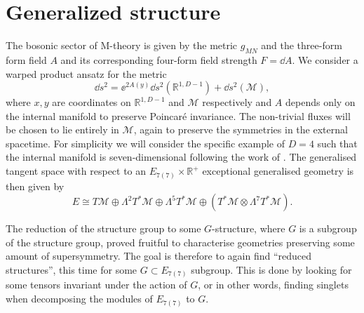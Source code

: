 \section{Generalized structure\label{sec:GeneralisedStructures}}
The bosonic sector of M-theory is given by the metric $g_{MN}$ and the three-form form field $A$ and its corresponding four-form field strength $F=\dd A$. We consider a warped product ansatz for the metric 
\begin{equation}
    \dd s^2 = \ee^{2A(y)}\dd s^2(\mathbb{R}^{1,D-1})+\dd s^2(\mathcal{M}),
\end{equation}
where $x,y$ are coordinates on $\mathbb{R}^{1,D-1}$ and $\mathcal{M}$ respectively and $A$ depends only on the internal manifold to preserve Poincaré invariance. The non-trivial fluxes will be chosen to lie entirely in $\mathcal{M}$, again to preserve the symmetries in the external spacetime. For simplicity we will consider the specific example of $D=4$ such that the internal manifold is seven-dimensional following the work of \cite{Ashmore:2015joa}. The generalised tangent space with respect to an $E_{7(7)}\times\mathbb{R}^+$ exceptional generalised geometry is then given by 
\begin{equation}
    E \cong T\mathcal{M}\oplus\Lambda^2T^*\mathcal{M}\oplus\Lambda^5T^*\mathcal{M}\oplus\left(T^*\mathcal{M}\otimes\Lambda^7 T^*\mathcal{M}\right).
\end{equation}

\begin{comment}
Moreover, given $E$ we can construct the generalized frame bundle $F$ given by frames $\{E_A\}$, where $A=1,2,\ldots 56$. Explicitly, in a patch $U$ there exists a canonical basis given by 
\begin{equation}
    \{E_A\} = \{\pd/\pd y^m\}\cup \{\dd y^{m_1}\wedge\dd y^{m_2}\}\cup\{\dd y^{m_1}\wedge\ldots\wedge\dd y^{m_5}\}\cup \{\dd y^m\otimes\dd y^{m_1}\wedge\ldots\wedge\dd y^{m_7}\},
\end{equation}
and any other frame is related to such a frame by an $E_{7(7)}\times \mathbb{R}^+$ transformation, this then defines a principle bundle $F$ with structure group $E_{7(7)}\times \mathbb{R}^+$. Any other tensor field can then be constructed as sections of an associated vector bundle, thus making the exceptional group manifest in the formulation. 
\end{comment}

The reduction of the structure group to some $G$-structure, where $G$ is a subgroup of the structure group, proved fruitful to characterise geometries preserving some amount of supersymmetry. The goal is therefore to again find ``reduced structures'', this time for some $G\subset E_{7(7)}$ subgroup. This is done by looking for some tensors invariant under the action of $G$, or in other words, finding singlets when decomposing the modules of $E_{7(7)}$ to $G$. 

